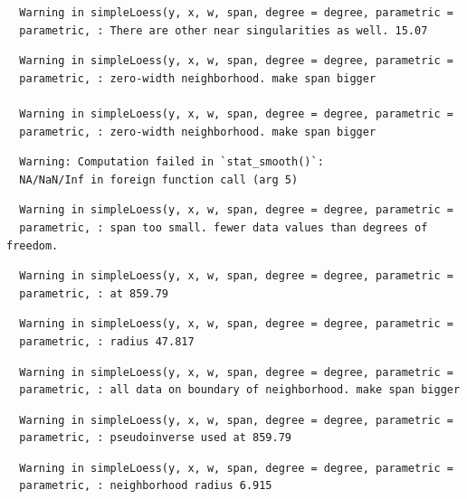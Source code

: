 \documentclass[12pt,twoside]{reedthesis}
\begin{document}
  \begin{verbatim}
  Warning in simpleLoess(y, x, w, span, degree = degree, parametric =
  parametric, : There are other near singularities as well. 15.07
  \end{verbatim}
  
  \begin{verbatim}
  Warning in simpleLoess(y, x, w, span, degree = degree, parametric =
  parametric, : zero-width neighborhood. make span bigger
  
  Warning in simpleLoess(y, x, w, span, degree = degree, parametric =
  parametric, : zero-width neighborhood. make span bigger
  \end{verbatim}
  
  \begin{verbatim}
  Warning: Computation failed in `stat_smooth()`:
  NA/NaN/Inf in foreign function call (arg 5)
  \end{verbatim}
  
  \begin{verbatim}
  Warning in simpleLoess(y, x, w, span, degree = degree, parametric =
  parametric, : span too small. fewer data values than degrees of freedom.
  \end{verbatim}
  
  \begin{verbatim}
  Warning in simpleLoess(y, x, w, span, degree = degree, parametric =
  parametric, : at 859.79
  \end{verbatim}
  
  \begin{verbatim}
  Warning in simpleLoess(y, x, w, span, degree = degree, parametric =
  parametric, : radius 47.817
  \end{verbatim}
  
  \begin{verbatim}
  Warning in simpleLoess(y, x, w, span, degree = degree, parametric =
  parametric, : all data on boundary of neighborhood. make span bigger
  \end{verbatim}
  
  \begin{verbatim}
  Warning in simpleLoess(y, x, w, span, degree = degree, parametric =
  parametric, : pseudoinverse used at 859.79
  \end{verbatim}
  
  \begin{verbatim}
  Warning in simpleLoess(y, x, w, span, degree = degree, parametric =
  parametric, : neighborhood radius 6.915
  \end{verbatim}
  
\end{document}
